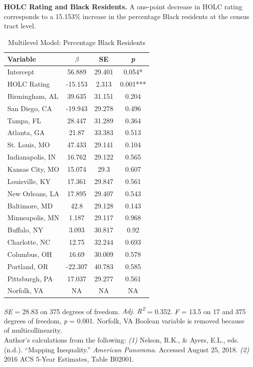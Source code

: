 \documentclass[paper=letter, fontsize=12pt]{scrartcl} %
\begin{document}
\begin{table}
	\textbf{HOLC Rating and Black Residents.} A one-point decrease in HOLC rating corresponds to a 15.153\% increase in the percentage Black residents at the census tract level.
	\caption{Multilevel Model: Percentage Black Residents}
	\begin{center}
		\begin{tabular}{|| l | c c c ||}
			\hline
			Variable & $\beta$ & SE & \textit{p}\\
			\hline \hline
			Intercept & 56.889 & 29.401 & 0.054*\\ 
			\hline 
			HOLC Rating & -15.153 & 2.313 & 0.001***\\ 
			\hline 
			Birmingham, AL & 39.635 & 31.151 & 0.204\\ 
			\hline 
			San Diego, CA & -19.943 & 29.278 & 0.496\\ 
			\hline 
			Tampa, FL & 28.447 & 31.289 & 0.364\\ 
			\hline 
			Atlanta, GA & 21.87 & 33.383 & 0.513\\ 
			\hline 
			St. Louis, MO & 47.433 & 29.141 & 0.104\\ 
			\hline 
			Indianapolis, IN & 16.762 & 29.122 & 0.565\\ 
			\hline 
			Kansas City, MO & 15.074 & 29.3 & 0.607\\ 
			\hline 
			Louisville, KY & 17.361 & 29.847 & 0.561\\ 
			\hline 
			New Orleans, LA & 17.895 & 29.407 & 0.543\\ 
			\hline 
			Baltimore, MD & 42.8 & 29.128 & 0.143\\ 
			\hline 
			Minneapolis, MN & 1.187 & 29.117 & 0.968\\ 
			\hline 
			Buffalo, NY & 3.093 & 30.817 & 0.92\\ 
			\hline 
			Charlotte, NC & 12.75 & 32.244 & 0.693\\ 
			\hline 
			Columbus, OH & 16.69 & 30.009 & 0.578\\ 
			\hline 
			Portland, OR & -22.307 & 40.783 & 0.585\\ 
			\hline 
			Pittsburgh, PA & 17.037 & 29.277 & 0.561\\ 
			\hline 
			Norfolk, VA & NA & NA & NA\\ 
			\hline
		\end{tabular}
	\end{center}
\textit{SE} = 28.83 on 375 degrees of freedom. \textit{Adj. R\textsuperscript{2}} = 0.352. \textit{F} = 13.5 on 17 and 375 degrees of freedom, \textit{p} = 0.001. Norfolk, VA Boolean variable is removed because of multicollinearity.\\
Author's calculations from the following: \textit{(1)} Nelson, R.K., \& Ayers, E.L., eds. (n.d.). ``Mapping Inequality.'' \textit{American Panorama}. Accessed August 25, 2018. \textit{(2)} 2016 ACS 5-Year Estimates, Table B02001.
\end{table}
\end{document}
